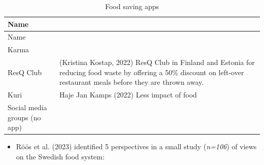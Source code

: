 \documentclass[
  letterpaper,
  DIV=11,
  numbers=noendperiod]{scrartcl}
\providecommand{\tightlist}{%
  \setlength{\itemsep}{0pt}\setlength{\parskip}{0pt}}\usepackage{longtable,booktabs,array}
\begin{document}
\begin{longtable}[]{@{}
  >{\raggedright\arraybackslash}p{}
  >{\raggedright\arraybackslash}p{}@{}}
\caption{Food saving apps}\tabularnewline
\toprule\noalign{}
\begin{minipage}[b]{\linewidth}\raggedright
Name
\end{minipage} & \begin{minipage}[b]{\linewidth}\raggedright
\end{minipage} \\
\midrule\noalign{}
\endfirsthead
\toprule\noalign{}
\begin{minipage}[b]{\linewidth}\raggedright
Name
\end{minipage} & \begin{minipage}[b]{\linewidth}\raggedright
\end{minipage} \\
\midrule\noalign{}
\endhead
\bottomrule\noalign{}
\endlastfoot
Karma & \\
ResQ Club & (Kristina Kostap, 2022) ResQ Club in Finland and Estonia for
reducing food waste by offering a 50\% discount on left-over restaurant
meals before they are thrown away. \\
Kuri & Haje Jan Kamps (2022) Less impact of food \\
Social media groups (no app) & \\
\end{longtable}

\begin{itemize}
\tightlist
\item
  Röös et al. (2023) identified 5 perspectives in a small study
  (\emph{n=106}) of views on the Swedish food system:
\end{itemize}
\end{document}
